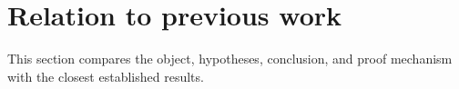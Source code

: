 \section{Relation to previous work}

This section compares the object, hypotheses, conclusion, and proof mechanism
with the closest established results.
